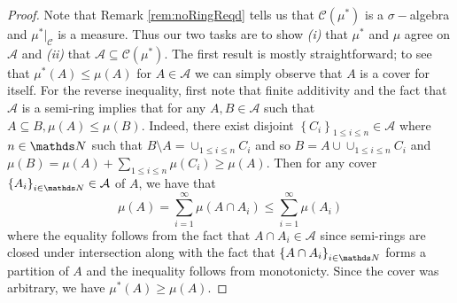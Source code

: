 \begin{proof}
Note that Remark \ref{rem:noRingReqd} tells us that $\mathcal{C}\left(\mu^{*}\right)$
is a $\sigma-$algebra and $\mu^{*}|_{\mathcal{C}}$ is a measure.
Thus our two tasks are to show \emph{(i)} that $\mu^{*}$ and $\mu$
agree on\emph{ $\mathcal{A}$ }and\emph{ (ii)} that $\mathcal{A}\subseteq\mathcal{C}\left(\mu^{*}\right)$.
The first result is mostly straightforward; to see that $\mu^{*}\left(A\right)\leq\mu\left(A\right)$
for $A\in\mathcal{A}$ we can simply observe that $A$ is a cover
for itself. For the reverse inequality, first note that finite additivity
and the fact that $\mathcal{A}$ is a semi-ring implies that for any
$A,B\in\mathcal{A}$ such that $A\subseteq B,\mu\left(A\right)\leq\mu\left(B\right).$
Indeed, there exist disjoint $\left\{ C_{i}\right\} _{1\leq i\leq n}\in\mathcal{A}$
where $n\in\N$ such that $B\setminus A=\cup_{1\leq i\leq n}C_{i}$
and so $B=A\cup\cup_{1\leq i\leq n}C_{i}$ and $\mu\left(B\right)=\mu\left(A\right)+\sum_{1\leq i\leq n}\mu\left(C_{i}\right)\geq\mu\left(A\right).$
Then for any cover $\left\{ A_{i}\right\} _{i\in\N}\in\mathcal{A}$
of $A$, we have that 
\[
\mu\left(A\right)=\sum_{i=1}^{\infty}\mu\left(A\cap A_{i}\right)\leq\sum_{i=1}^{\infty}\mu\left(A_{i}\right)
\]
where the equality follows from the fact that $A\cap A_{i}\in\mathcal{A}$
since semi-rings are closed under intersection along with the fact
that $\left\{ A\cap A_{i}\right\} _{i\in\N}$ forms a partition of
$A$ and the inequality follows from monotonicty. Since the cover
was arbitrary, we have $\mu^{*}\left(A\right)\geq\mu\left(A\right).$


\end{proof}
